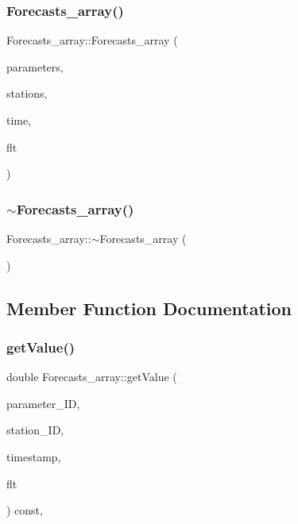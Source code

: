 \subsubsection{\texorpdfstring{Forecasts\+\_\+array()}{Forecasts\_array()}\hspace{0.1cm}{\footnotesize\ttfamily [3/3]}}
{\footnotesize\ttfamily Forecasts\+\_\+array\+::\+Forecasts\+\_\+array (\begin{DoxyParamCaption}\item[{\mbox{\hyperlink{class_parameters}{Parameters}}}]{parameters,  }\item[{\mbox{\hyperlink{class_stations}{Stations}}}]{stations,  }\item[{\mbox{\hyperlink{class_times}{Times}}}]{time,  }\item[{\mbox{\hyperlink{class_f_l_ts}{F\+L\+Ts}}}]{flt }\end{DoxyParamCaption})}

\mbox{\label{class_forecasts__array_a7e13cb82b1ab76a45946cff992c7fff4}} 
\subsubsection{\texorpdfstring{$\sim$\+Forecasts\+\_\+array()}{~Forecasts\_array()}}
{\footnotesize\ttfamily Forecasts\+\_\+array\+::$\sim$\+Forecasts\+\_\+array (\begin{DoxyParamCaption}{ }\end{DoxyParamCaption})\hspace{0.3cm}{\ttfamily [virtual]}}



\subsection{Member Function Documentation}
\mbox{\label{class_forecasts__array_a38f7b890af0947e0d2022ce5bc5bb514}} 
\subsubsection{\texorpdfstring{get\+Value()}{getValue()}}
{\footnotesize\ttfamily double Forecasts\+\_\+array\+::get\+Value (\begin{DoxyParamCaption}\item[{std\+::size\+\_\+t}]{parameter\+\_\+\+ID,  }\item[{std\+::size\+\_\+t}]{station\+\_\+\+ID,  }\item[{double}]{timestamp,  }\item[{double}]{flt }\end{DoxyParamCaption}) const\hspace{0.3cm}{\ttfamily [override]}, {\ttfamily [virtual]}}



